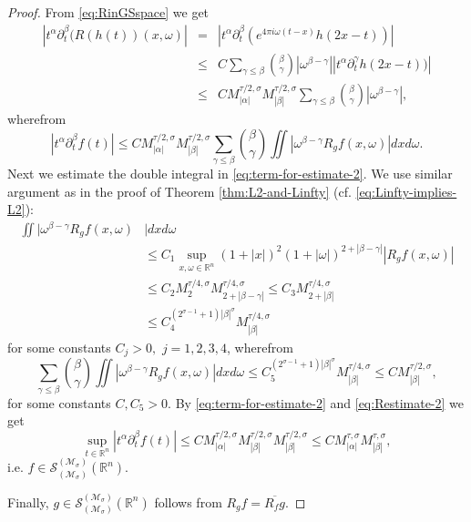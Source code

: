 \documentclass[10pt,a4paper]{amsart}
\begin{document}
\begin{proof}
From \eqref{eq:RinGSspace} we get
\begin{eqnarray}
 | t^\alpha \partial^\beta _t (R (h (t)) (x, \omega) |
&  = &
| t^\alpha \partial^\beta _t  ( e^{4\pi i \omega (t-x)} h(2x-t))|
\nonumber \\
&  \leq &
C \sum_{\gamma \leq \beta} \binom{\beta}{\gamma}
|\omega^{\beta - \gamma} |
 | t^{\alpha}  \partial^\gamma _t h(2x-t))| 
 \nonumber \\
&  \leq &
C M^{\tau/2, \sigma} _{|\alpha|} M^{\tau/2, \sigma} _{|\beta|} 
\sum_{\gamma \leq \beta} \binom{\beta}{\gamma}
|\omega^{\beta - \gamma} |, 
\nonumber
\end{eqnarray}
wherefrom
\begin{equation} \label{eq:term-for-estimate-2}
|t^\alpha \partial^\beta _t f (t) |
\leq C
M^{\tau/2, \sigma} _{|\alpha|} M^{\tau/2, \sigma} _{|\beta|} 
\sum_{\gamma \leq \beta} \binom{\beta}{\gamma}
\iint |\omega^{\beta - \gamma}  R_{g} f (x, \omega)|
dx d\omega.
\end{equation}
Next we estimate the double integral in \eqref{eq:term-for-estimate-2}. We use  similar argument as in the proof of Theorem \ref{thm:L2-and-Linfty} (cf. \eqref{eq:Linfty-implies-L2}):
\begin{align}
\iint |\omega^{\beta - \gamma}  R_{g} f (x, \omega) & |
 dx d\omega \nonumber \\
  & \leq 
C_1 \sup_{x,\omega \in \mathbb R^{n}} (1+|x|)^2
(1+|\omega|)^{2+|\beta - \gamma|} |R_{g} f (x, \omega)|
\nonumber \\
  & \leq 
C_2    M^{\tau/4, \sigma} _{2} M^{\tau/4, \sigma} _{2+|\beta -\gamma|}  \leq C_3 M^{\tau/4, \sigma} _{2+|\beta|} 
\nonumber \\
  & \leq 
C_4 ^{(2^{\sigma - 1} +1) |\beta|^\sigma} 
 M^{\tau/4, \sigma} _{|\beta|} 
 \nonumber
\end{align}
for some constants $ C_j >0,$ $ j =1,2,3,4$, wherefrom
\begin{equation}
\sum_{\gamma \leq \beta} \binom{\beta}{\gamma}
\iint |\omega^{\beta - \gamma}  R_{g} f (x, \omega)|
dx d\omega
\leq 
C_5 ^{(2^{\sigma - 1} +1) |\beta|^\sigma} 
M^{\tau/4, \sigma} _{|\beta|} 
\leq
 C M^{\tau/2, \sigma} _{|\beta|},
  \label{eq:Restimate-2}
\end{equation}
for some constants $C, C_5 > 0$.
By \eqref{eq:term-for-estimate-2} and 
\eqref{eq:Restimate-2} we get
$$
\sup_{t \in \mathbb R^{n}}
|t^\alpha \partial^\beta _t f (t) | \leq
C 
M^{\tau/2, \sigma} _{|\alpha|} M^{\tau/2, \sigma} _{|\beta|}  M^{\tau/2, \sigma} _{|\beta|}
\leq
C 
M^{\tau, \sigma} _{|\alpha|} M^{\tau, \sigma} _{|\beta|},  
$$
i.e. $ f \in \mathcal S_{(\mathcal{M}_\sigma )}^{(\mathcal{M}_\sigma)} (\mathbb R^{n}) $.

Finally, $ g \in \mathcal S_{(\mathcal{M}_\sigma )}^{(\mathcal{M}_\sigma)} (\mathbb R^{n}) $
follows from 
$  R_g f = \overline{R_f g}$.
\end{proof}
\end{document}
